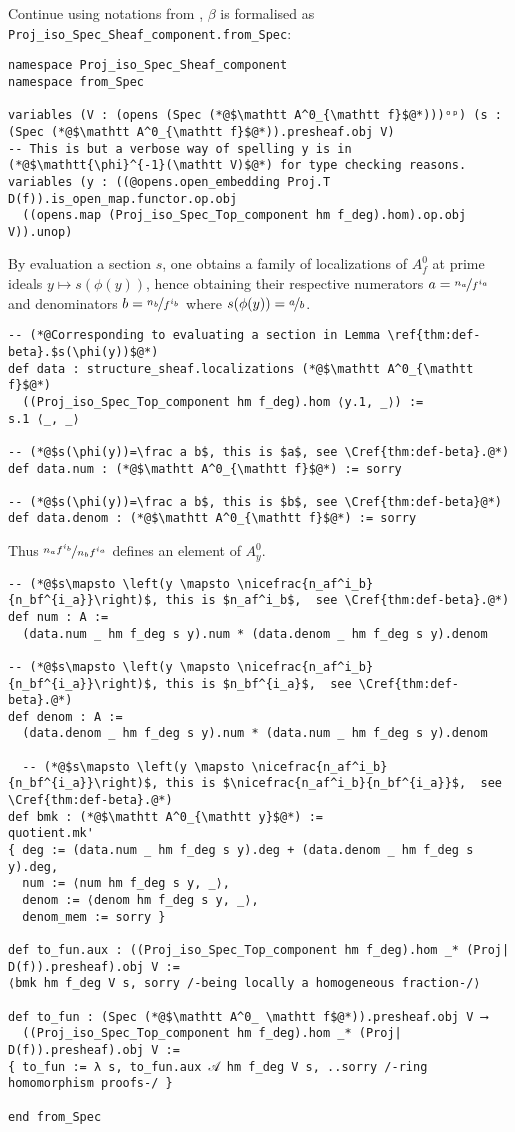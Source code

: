 \documentclass[a4paper,UKenglish,cleveref, autoref, thm-restate]{lipics-v2021}
\begin{document}
Continue using notations from , $\beta$ is formalised as \lstinline{Proj_iso_Spec_Sheaf_component.from_Spec}:
\begin{lstlisting}
namespace Proj_iso_Spec_Sheaf_component
namespace from_Spec

variables (V : (opens (Spec (*@$\mathtt A^0_{\mathtt f}$@*)))ᵒᵖ) (s : (Spec (*@$\mathtt A^0_{\mathtt f}$@*)).presheaf.obj V)
-- This is but a verbose way of spelling y is in (*@$\mathtt{\phi}^{-1}(\mathtt V)$@*) for type checking reasons.
variables (y : ((@opens.open_embedding Proj.T D(f)).is_open_map.functor.op.obj
  ((opens.map (Proj_iso_Spec_Top_component hm f_deg).hom).op.obj V)).unop)
\end{lstlisting}
By evaluation a section $s$, one obtains a family of localizations of $A^0_f$ at prime ideals $y\mapsto s(\phi(y))$, hence obtaining their respective numerators $a=\nicefrac{n_a}{f^{i_a}}$ and denominators $b = \nicefrac{n_b}{f^{i_b}}$ where $s(\phi(y)) = \nicefrac a b$.
\begin{lstlisting}
-- (*@Corresponding to evaluating a section in Lemma \ref{thm:def-beta}.$s(\phi(y))$@*)
def data : structure_sheaf.localizations (*@$\mathtt A^0_{\mathtt f}$@*)
  ((Proj_iso_Spec_Top_component hm f_deg).hom ⟨y.1, _⟩) :=
s.1 ⟨_, _⟩

-- (*@$s(\phi(y))=\frac a b$, this is $a$, see \Cref{thm:def-beta}.@*)
def data.num : (*@$\mathtt A^0_{\mathtt f}$@*) := sorry

-- (*@$s(\phi(y))=\frac a b$, this is $b$, see \Cref{thm:def-beta}@*)
def data.denom : (*@$\mathtt A^0_{\mathtt f}$@*) := sorry
\end{lstlisting}
Thus $\nicefrac{n_af^{i_b}}{n_bf^{i_a}}$ defines an element of $A^0_y$.
\begin{lstlisting}
-- (*@$s\mapsto \left(y \mapsto \nicefrac{n_af^i_b}{n_bf^{i_a}}\right)$, this is $n_af^i_b$,  see \Cref{thm:def-beta}.@*)
def num : A :=
  (data.num _ hm f_deg s y).num * (data.denom _ hm f_deg s y).denom

-- (*@$s\mapsto \left(y \mapsto \nicefrac{n_af^i_b}{n_bf^{i_a}}\right)$, this is $n_bf^{i_a}$,  see \Cref{thm:def-beta}.@*)
def denom : A :=
  (data.denom _ hm f_deg s y).num * (data.num _ hm f_deg s y).denom

  -- (*@$s\mapsto \left(y \mapsto \nicefrac{n_af^i_b}{n_bf^{i_a}}\right)$, this is $\nicefrac{n_af^i_b}{n_bf^{i_a}}$,  see \Cref{thm:def-beta}.@*)
def bmk : (*@$\mathtt A^0_{\mathtt y}$@*) :=
quotient.mk'
{ deg := (data.num _ hm f_deg s y).deg + (data.denom _ hm f_deg s y).deg,
  num := ⟨num hm f_deg s y, _⟩,
  denom := ⟨denom hm f_deg s y, _⟩,
  denom_mem := sorry }

def to_fun.aux : ((Proj_iso_Spec_Top_component hm f_deg).hom _* (Proj| D(f)).presheaf).obj V :=
⟨bmk hm f_deg V s, sorry /-being locally a homogeneous fraction-/⟩

def to_fun : (Spec (*@$\mathtt A^0_ \mathtt f$@*)).presheaf.obj V ⟶
  ((Proj_iso_Spec_Top_component hm f_deg).hom _* (Proj| D(f)).presheaf).obj V :=
{ to_fun := λ s, to_fun.aux 𝒜 hm f_deg V s, ..sorry /-ring homomorphism proofs-/ }

end from_Spec
\end{lstlisting}
\end{document}
